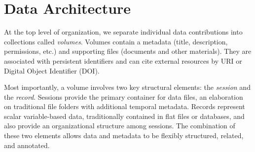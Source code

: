 \documentclass{sig-alternate}
\begin{document}


\section{Data Architecture}

At the top level of organization, we separate individual data contributions into collections called \emph{volumes}.
Volumes contain a metadata (title, description, permissions, etc.) and supporting files (documents and other materials).
They are associated with persistent identifiers and can cite external resources by URI or Digital Object Identifier (DOI).

Most importantly, a volume involves two key structural elements: the \emph{session} and the \emph{record}.
Sessions provide the primary container for data files, an elaboration on traditional file folders with additional temporal metadata.
Records represent scalar variable-based data, traditionally contained in flat files or databases, and also provide an organizational structure among sessions.
The combination of these two elements allows data and metadata to be flexibly structured, related, and annotated.
\end{document}
